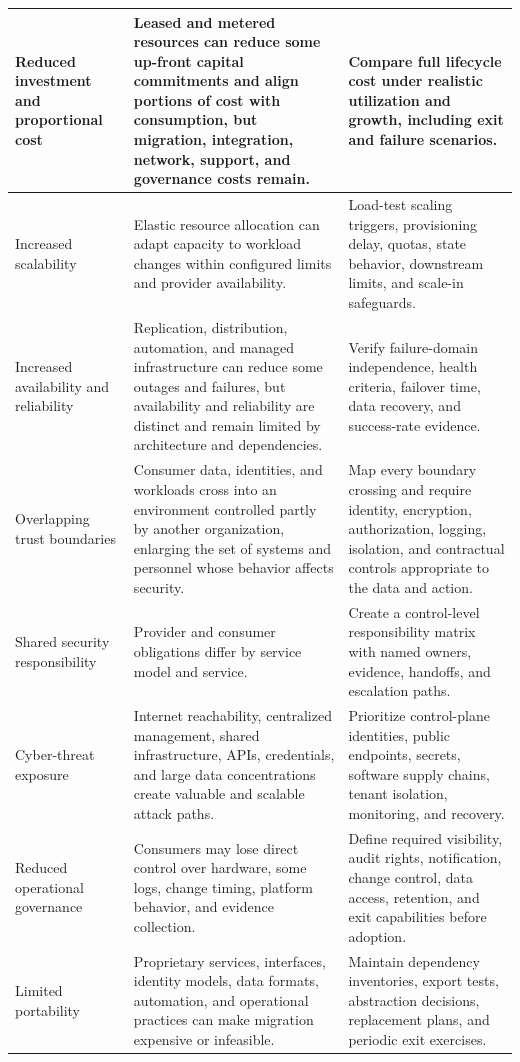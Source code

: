 \documentclass[11pt]{article}
\begin{document}
\begin{longtable}{@{}>{\RaggedRight\arraybackslash}p{}>{\RaggedRight\arraybackslash}p{}>{\RaggedRight\arraybackslash}p{}@{}}
Reduced investment and proportional cost & Leased and metered resources can reduce some up-front capital commitments and align portions of cost with consumption, but migration, integration, network, support, and governance costs remain. & Compare full lifecycle cost under realistic utilization and growth, including exit and failure scenarios. \\\midrule
Increased scalability & Elastic resource allocation can adapt capacity to workload changes within configured limits and provider availability. & Load-test scaling triggers, provisioning delay, quotas, state behavior, downstream limits, and scale-in safeguards. \\\midrule
Increased availability and reliability & Replication, distribution, automation, and managed infrastructure can reduce some outages and failures, but availability and reliability are distinct and remain limited by architecture and dependencies. & Verify failure-domain independence, health criteria, failover time, data recovery, and success-rate evidence. \\\midrule
Overlapping trust boundaries & Consumer data, identities, and workloads cross into an environment controlled partly by another organization, enlarging the set of systems and personnel whose behavior affects security. & Map every boundary crossing and require identity, encryption, authorization, logging, isolation, and contractual controls appropriate to the data and action. \\\midrule
Shared security responsibility & Provider and consumer obligations differ by service model and service. & Create a control-level responsibility matrix with named owners, evidence, handoffs, and escalation paths. \\\midrule
Cyber-threat exposure & Internet reachability, centralized management, shared infrastructure, APIs, credentials, and large data concentrations create valuable and scalable attack paths. & Prioritize control-plane identities, public endpoints, secrets, software supply chains, tenant isolation, monitoring, and recovery. \\\midrule
Reduced operational governance & Consumers may lose direct control over hardware, some logs, change timing, platform behavior, and evidence collection. & Define required visibility, audit rights, notification, change control, data access, retention, and exit capabilities before adoption. \\\midrule
Limited portability & Proprietary services, interfaces, identity models, data formats, automation, and operational practices can make migration expensive or infeasible. & Maintain dependency inventories, export tests, abstraction decisions, replacement plans, and periodic exit exercises. \\\midrule

\end{longtable}
\end{document}
